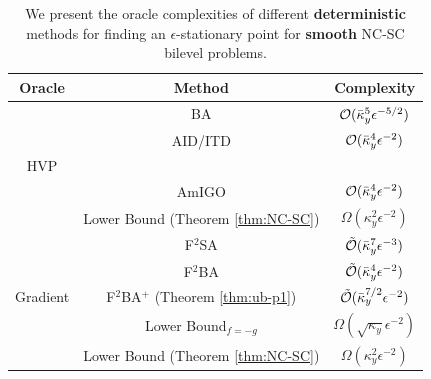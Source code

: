 \documentclass{article}
\begin{document}
\begin{table}[t] 
    \centering
     \caption{We present the oracle complexities of different \textbf{deterministic} methods for finding an $\epsilon$-stationary point for \textbf{smooth} NC-SC bilevel problems.
     }
    \label{tab:det}
    \begin{tabular}{c c c}
    \hline 
    Oracle   &  Method & Complexity \\ 
    \hline \addlinespace 
    & BA \citep{ghadimi2018approximation} & ${\mathcal{O}}( \bar \kappa_y^5 \epsilon^{-5/2})$ 
    \\ \addlinespace
      & AID/ITD  \citep{ji2021bilevel} & ${\mathcal{O}}(\bar \kappa_y^4 \epsilon^{-2})$ \\ 
    \vspace{-2.5mm} 
    HVP \\
      &  AmIGO \citep{arbel2022amortized} & ${\mathcal{O}}(\bar \kappa_y^4 \epsilon^{-2})$ \\ \addlinespace
      & \cellcolor{gray!20} Lower Bound (Theorem \ref{thm:NC-SC}) 
      & 
      \cellcolor{gray!20} 
      $\Omega(\kappa_y^2 \epsilon^{-2})$  \\
    \hline \addlinespace 
    & F${}^2$SA \citep{kwon2023fully} & $\tilde {{\mathcal{O}}}(\bar \kappa_y^7 \epsilon^{-3})$ \\
    \addlinespace
    & F${}^2$BA \citep{chen2023near} & $\tilde {{\mathcal{O}}}(\bar \kappa_y^4 \epsilon^{-2})$ \\
    \addlinespace 
   Gradient & \cellcolor{gray!20} F${}^2$BA${}^+$ (Theorem \ref{thm:ub-p1}) & \cellcolor{gray!20} $\tilde {{\mathcal{O}}}(\bar \kappa_y^{7/2} \epsilon^{-2})$ \\ 
    \addlinespace 
    & Lower Bound$_{f=-g}$ \citep{li2021complexity} %
    & $\Omega( \sqrt{\kappa_y} \epsilon^{-2})$ \\
    \addlinespace
    & \cellcolor{gray!20} Lower Bound (Theorem \ref{thm:NC-SC}) & 
    \cellcolor{gray!20}
    $\Omega(\kappa_y^2 \epsilon^{-2})$ \\ 
    \hline 
    \end{tabular}
\end{table}


\end{document}
